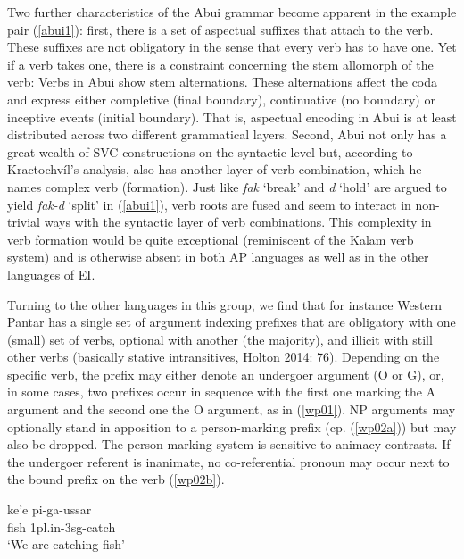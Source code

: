 Two further characteristics of the Abui grammar become apparent in the example pair (\ref{abui1}): first, there is a set of aspectual suffixes that attach to the verb. These suffixes are not obligatory in the sense that every verb has to have one. Yet if a verb takes one, there is a constraint concerning the stem allomorph of the verb: Verbs in Abui show stem alternations. These alternations affect the coda and express either completive (final boundary), continuative (no boundary) or inceptive events (initial boundary). That is, aspectual encoding in Abui is at least distributed across two different grammatical layers. Second, Abui not only has a great wealth of SVC constructions on the syntactic level but, according to Kractochvíl's analysis, also has another layer of verb combination, which he names complex verb (formation). Just like \textit{fak} `break' and \textit{d} `hold' are argued to yield \textit{fak-d} `split' in (\ref{abui1}), verb roots are fused and seem to interact in non-trivial ways with the syntactic layer of verb combinations. This complexity in verb formation would be quite exceptional (reminiscent of the Kalam verb system) and is otherwise absent in both AP languages as well as in the other languages of EI.

Turning to the other languages in this group, we find that for instance Western Pantar has a single set of argument indexing prefixes that are obligatory with one (small) set of verbs, optional with another (the majority), and illicit with still other verbs (basically stative intransitives, Holton 2014: 76). Depending on the specific verb, the prefix may either denote an undergoer argument (O or G), or, in some cases, two prefixes occur in sequence with the first one marking the A argument and the second one the O argument, as in (\ref{wp01}). NP arguments may optionally stand in apposition to a person-marking prefix (cp. (\ref{wp02a})) but may also be dropped. The person-marking system is sensitive to animacy contrasts. If the undergoer referent is inanimate, no co-referential pronoun may occur next to the bound prefix on the verb (\ref{wp02b}).

\ea \label{wp01}
\gll ke'e pi-ga-ussar \\
fish \acs{1}\acs{pl}.\acs{in}-\acs{3}\acs{sg}-catch \\
\glft `We are catching fish' \\ 
\z
\xe

